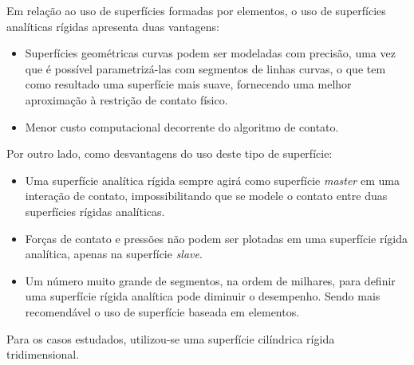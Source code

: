 Em relação ao uso de superfícies formadas por elementos, o uso de superfícies analíticas rígidas apresenta duas vantagens:
\begin{itemize}
    \item Superfícies geométricas curvas podem ser modeladas com precisão, uma vez que é possível parametrizá-las com segmentos de linhas curvas, o que tem como resultado uma superfície mais suave, fornecendo uma melhor aproximação à restrição de contato físico.
    \item Menor custo computacional decorrente do algoritmo de contato.
\end{itemize}

Por outro lado, como desvantagens do uso deste tipo de superfície:
\begin{itemize}
    \item Uma superfície analítica rígida sempre agirá como superfície \textit{master} em uma interação de contato, impossibilitando que se modele o contato entre duas superfícies rígidas analíticas.
    \item Forças de contato e pressões não podem ser plotadas em uma superfície rígida analítica, apenas na superfície \textit{slave}.
    \item Um número muito grande de segmentos, na ordem de milhares, para definir uma superfície rígida analítica pode diminuir o desempenho. Sendo mais recomendável o uso de superfície baseada em elementos.
\end{itemize}


Para os casos estudados, utilizou-se uma superfície cilíndrica rígida tridimensional.
